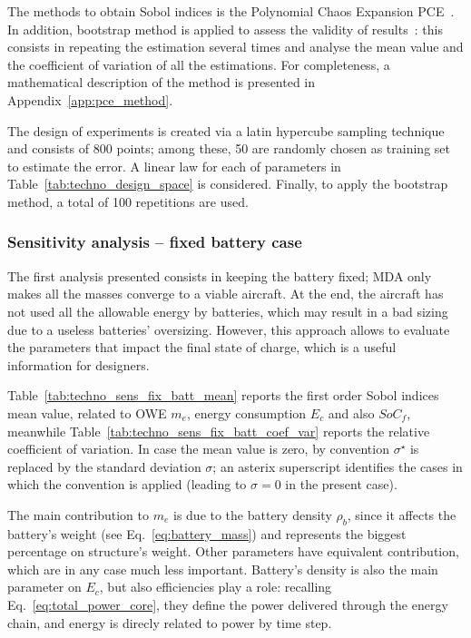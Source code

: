 The methods to obtain Sobol indices is the Polynomial Chaos Expansion PCE~\cite{bib:blatman_pce}. 
In addition, bootstrap method is applied to assess the validity of results~\cite{bib:dubreuil}: this consists in repeating the estimation several times and analyse the mean value and the coefficient of variation of all the estimations. 
For completeness, a mathematical description of the method is presented in Appendix~\ref{app:pce_method}.

The design of experiments is created via a latin hypercube sampling technique~\cite{bib:sacks} and consists of 800 points; among these, 50 are randomly chosen as training set to estimate the error. 
A linear law for each of parameters in Table~\ref{tab:techno_design_space} is considered.
Finally, to apply the bootstrap method, a total of 100 repetitions are used. 

\subsubsection{Sensitivity analysis -- fixed battery case}
\label{subsubsec:chap3_sens_an_fix_batt}
The first analysis presented consists in keeping the battery fixed; MDA only makes all the masses converge to a viable aircraft.
At the end, the aircraft has not used all the allowable energy by batteries, which may result in a bad sizing due to a useless batteries' oversizing. 
However, this approach allows to evaluate the parameters that impact the final state of charge, which is a useful information for designers. 

Table~\ref{tab:techno_sens_fix_batt_mean} reports the first order Sobol indices mean value, related to OWE $m_e$, energy consumption $E_c$ and also $SoC_f$, meanwhile Table~\ref{tab:techno_sens_fix_batt_coef_var} reports the relative coefficient of variation.
In case the mean value is zero, by convention $\sigma^\star$ is replaced by the standard deviation $\sigma$; an asterix superscript identifies the cases in which the convention is applied (leading to $\sigma=0$ in the present case). 

The main contribution to $m_e$ is due to the battery density $\rho_{b}$, since it affects the battery's weight (see Eq.~\eqref{eq:battery_mass}) and represents the biggest percentage on structure's weight. 
Other parameters have equivalent contribution, which are in any case much less important.
Battery's density  is also the main parameter on $E_c$, but also efficiencies play a role: recalling Eq.~\eqref{eq:total_power_core}, they define the power delivered through the energy chain, and energy is direcly related to power by time step. 

